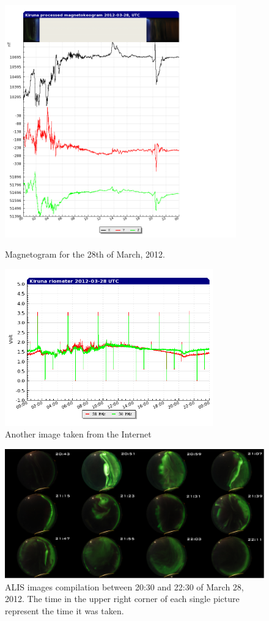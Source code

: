 \documentclass{article}
\begin{document}
\begin{figure}[ht]
\begin{minipage}[b]{0.5\linewidth}
\centering
\includegraphics[width=10cm]{Figures/magnetometer.png}
\caption{Magnetogram for the 28th of March, 2012.}
\label{fig:magnetometer}
\end{minipage}
\hspace{0.2cm}
\begin{minipage}[b]{0.5\linewidth}
\centering
\includegraphics[width=9cm]{Figures/riometer.png}
\caption{Another image taken from the Internet}
\label{fig:riometer}
\end{minipage}
\end{figure}

\begin{figure}[htbp!]
\centering
\centerline{\includegraphics[width=\textwidth]{Figures/awowa.png}}
\caption{ALIS images compilation between 20:30 and 22:30 of March 28, 2012. The time in the upper right corner of each single picture represent the time it was taken.}
\label{fig:ALIS}
\end{figure}
\end{document}
